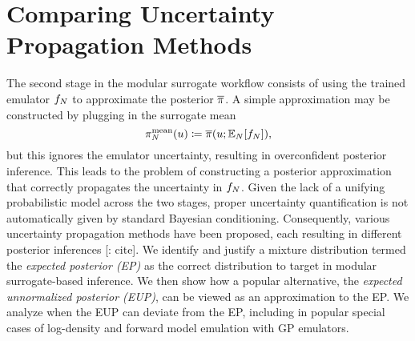 \documentclass[12pt]{article}
\begin{document}
\section{Comparing Uncertainty Propagation Methods} \label{sec:compare-unc-prop}
The second stage in the modular surrogate workflow consists of using the 
trained emulator $f_{N}$ to approximate the posterior $\overline{\pi}$.
A simple approximation may be constructed by plugging in the surrogate mean
\begin{equation}
\pi_{N}^{\mathrm{mean}}(u) \coloneqq \overline{\pi}(u; \mathbb{E}_{N}[f_{N}]),
\label{eq:mean-approx}
\end{equation}
but this ignores the emulator uncertainty, resulting in overconfident 
posterior inference. This leads to the problem of constructing a posterior 
approximation that correctly propagates the uncertainty in $f_{N}$. 
Given the lack of a unifying probabilistic model across the two stages, proper uncertainty 
quantification is not automatically given by standard Bayesian conditioning.
Consequently, various uncertainty propagation methods have been 
proposed, each resulting in different posterior inferences [\todo: cite].
We identify and justify a mixture distribution termed the 
\textit{expected posterior (EP)} as the correct distribution to target in 
modular surrogate-based inference. We then show how a popular alternative,
the \textit{expected unnormalized posterior (EUP)}, can be viewed as an 
approximation to the EP. We analyze when the EUP can deviate from the EP,
including in popular special cases of log-density and forward model emulation
with GP emulators.
\end{document}
